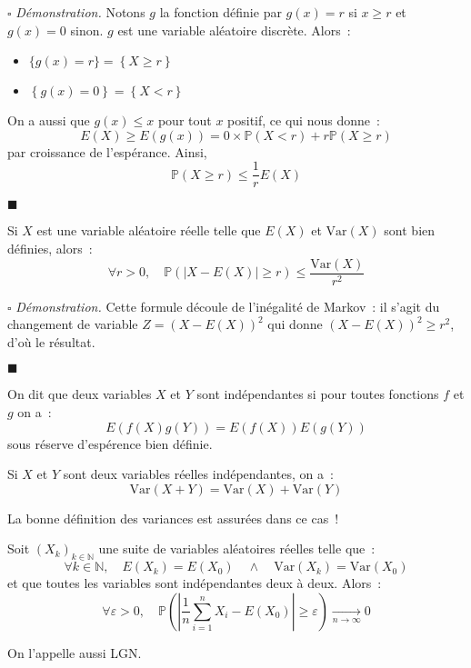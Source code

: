 \documentclass[a4paper, titlepage]{article}
\renewenvironment{proof}{$\square$ \footnotesize\textit{Démonstration.}}{\begin{flushright}$\blacksquare$\end{flushright}}
\begin{document}
	\begin{proof}
		Notons $g$ la fonction définie par $g(x) = r$ si $x \geqslant r$ et $g(x) = 0$ sinon. $g$ est une variable aléatoire discrète. Alors~:
		\begin{itemize}
			\item $\{g(x)=r\} = \left\{ X\geqslant r \right\} $
			\item $\left\{ g(x) = 0 \right\} = \left\{ X < r \right\}$
		\end{itemize}
		On a aussi que $g(x) \leqslant x$ pour tout $x$ positif, ce qui nous donne~:
		$$ E(X) \geqslant E(g(x)) = 0\times\mathbb{P}(X < r) + r\mathbb{P}(X \geqslant r) $$
		par croissance de l'espérance. Ainsi,
		$$ \mathbb{P}(X\geqslant r) \leqslant \frac{1}{r}E(X) $$
	\end{proof}

	\begin{props}
		Si $X$ est une variable aléatoire réelle telle que $E(X)$ et $\mathrm{Var}(X)$ sont bien définies, alors~:
		$$ \forall r>0,\quad \mathbb{P}(|X-E(X)| \geqslant r)\leqslant \frac{\mathrm{Var}(X)}{r^2} $$
	\end{props}
	\begin{proof}
		Cette formule découle de l'inégalité de Markov~: il s'agit du changement de variable $Z=(X-E(X))^2$ qui donne $(X-E(X))^2 \geqslant r^2$, d'où le résultat.
	\end{proof}

	\begin{defn}
		On dit que deux variables $X$ et $Y$ sont indépendantes si pour toutes fonctions $f$ et $g$ on a~:
		$$ E(f(X)g(Y)) = E(f(X))E(g(Y)) $$
		sous réserve d'espérence bien définie.
	\end{defn}

	\begin{thm}
		Si $X$ et $Y$ sont deux variables réelles indépendantes, on a~:
		$$ \mathrm{Var}(X+Y) = \mathrm{Var}(X)+\mathrm{Var}(Y) $$
	\end{thm}
	La bonne définition des variances est assurées dans ce cas~!

	\begin{thm}
		Soit $(X_k)_{k\in\mathbb{N}}$ une suite de variables aléatoires réelles telle que~:
		$$ \forall k\in \mathbb{N},\quad E(X_k) = E(X_0)\quad\land\quad\mathrm{Var}(X_k) = \mathrm{Var}(X_0) $$
		et que toutes les variables sont indépendantes deux à deux. Alors~:
		$$ \forall \varepsilon > 0,\quad \mathbb{P}\left( \left| \frac{1}{n}\sum_{i=1}^{n} X_i-E(X_0) \right| \geqslant \varepsilon \right) \xrightarrow[n \to \infty]{} 0 $$
	\end{thm}
	On l'appelle aussi LGN.
\end{document}
